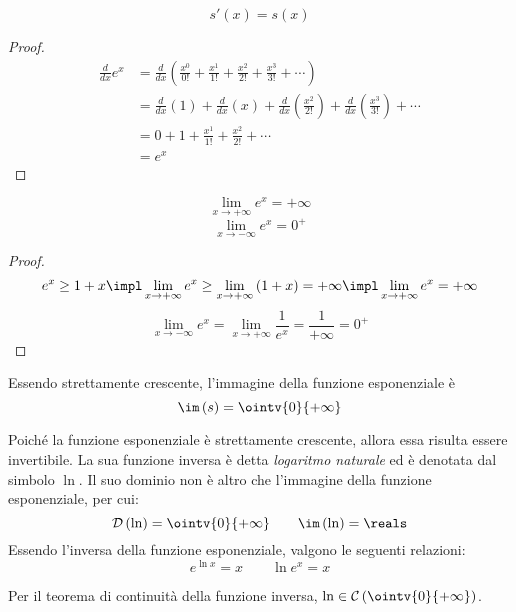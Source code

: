 \begin{theorem}
  $$s'\left( x \right)=s\left( x \right)$$
\end{theorem}
\begin{proof}
  \begin{align*}
    \frac{d}{dx} e^x & = \frac{d}{dx} \left( \frac{x^0}{0!} + \frac{x^1}{1!} + \frac{x^2}{2!} + \frac{x^3}{3!} + \cdots \right)                                                           \\
                     & = \frac{d}{dx} \left( 1 \right) + \frac{d}{dx} \left( x \right) + \frac{d}{dx} \left( \frac{x^2}{2!} \right) + \frac{d}{dx} \left( \frac{x^3}{3!} \right) + \cdots \\
                     & = 0 + 1 + \frac{x^1}{1!} + \frac{x^2}{2!} +\cdots                                                                                                                  \\
                     & = e^x                                                                                                                                                              
  \end{align*}
\end{proof}

\begin{lemma}
  $$\lim_{x\to+\infty} e^x=+\infty$$
  $$\lim_{x\to-\infty} e^x=0^+$$
\end{lemma}
\begin{proof}
  $$e^x\ge 1+x\impl \lim_{x\to+\infty}e^x\ge\lim_{x\to+\infty}\left( 1+x \right)=+\infty\impl \lim_{x\to+\infty}e^x=+\infty$$
  $$\lim_{x\to-\infty}e^x=\lim_{x\to+\infty}\frac{1}{e^x}=\frac{1}{+\infty}=0^+$$
\end{proof}

\begin{observation}
  Essendo strettamente crescente, l'immagine della funzione esponenziale è $$\im\left( s \right)=\ointv{0}{+\infty}$$
\end{observation}

Poiché la funzione esponenziale è strettamente crescente, allora essa risulta essere invertibile. La sua funzione inversa è detta \emph{logaritmo naturale} ed è denotata dal simbolo $\ln$. Il suo dominio non è altro che l'immagine della funzione esponenziale, per cui:
$$\mathcal{D}\left( \ln \right)=\ointv{0}{+\infty}\qquad \im \left( \ln \right)=\reals$$
Essendo l'inversa della funzione esponenziale, valgono le seguenti relazioni:
$$e^{\ln x}=x\qquad \ln e^x=x$$
\begin{observation}
  Per il teorema di continuità della funzione inversa, $\ln\in\mathcal{C}\left( \ointv{0}{+\infty} \right)$.
\end{observation}

